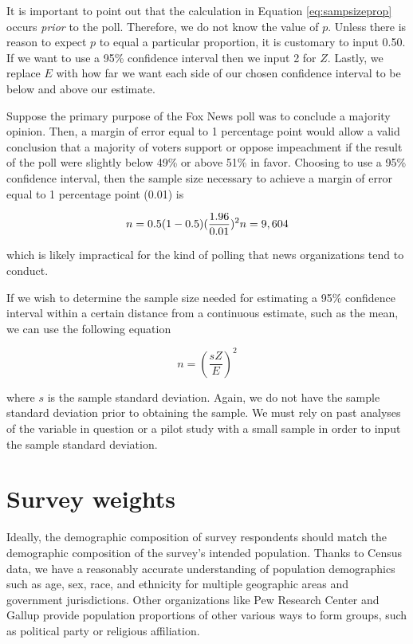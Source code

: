 \documentclass[
]{book}
\begin{document}
It is important to point out that the calculation in Equation \eqref{eq:sampsizeprop} occurs \emph{prior} to the poll. Therefore, we do not know the value of \(p\). Unless there is reason to expect \(p\) to equal a particular proportion, it is customary to input 0.50. If we want to use a 95\% confidence interval then we input 2 for \(Z\). Lastly, we replace \(E\) with how far we want each side of our chosen confidence interval to be below and above our estimate.

Suppose the primary purpose of the Fox News poll was to conclude a majority opinion. Then, a margin of error equal to 1 percentage point would allow a valid conclusion that a majority of voters support or oppose impeachment if the result of the poll were slightly below 49\% or above 51\% in favor. Choosing to use a 95\% confidence interval, then the sample size necessary to achieve a margin of error equal to 1 percentage point (0.01) is

\begin{equation}
n=0.5(1-0.5)({\frac{1.96}{0.01}})^2\\
n=9,604
\end{equation}

which is likely impractical for the kind of polling that news organizations tend to conduct.

If we wish to determine the sample size needed for estimating a 95\% confidence interval within a certain distance from a continuous estimate, such as the mean, we can use the following equation

\begin{equation}
n=(\frac{sZ}{E})^2
\label{eq:sampsizemean}
\end{equation}

where \(s\) is the sample standard deviation. Again, we do not have the sample standard deviation prior to obtaining the sample. We must rely on past analyses of the variable in question or a pilot study with a small sample in order to input the sample standard deviation.

\hypertarget{survey-weights}{%
\section{Survey weights}\label{survey-weights}}

Ideally, the demographic composition of survey respondents should match the demographic composition of the survey's intended population. Thanks to Census data, we have a reasonably accurate understanding of population demographics such as age, sex, race, and ethnicity for multiple geographic areas and government jurisdictions. Other organizations like Pew Research Center and Gallup provide population proportions of other various ways to form groups, such as political party or religious affiliation.
\end{document}
